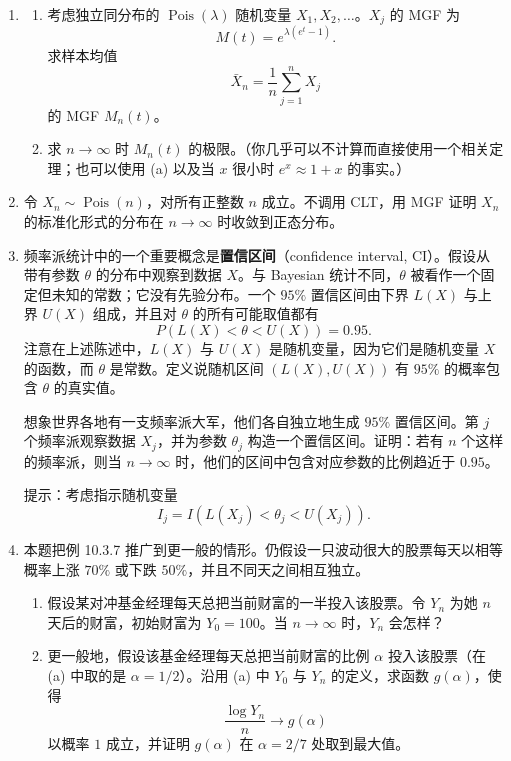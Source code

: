 \documentclass[UTF8, 12pt, fontset=fandol, oneside]{ctexart}
\begin{document}
\begin{enumerate}
  \item
  \begin{enumerate}
    \item 考虑独立同分布的 $\operatorname{Pois}(\lambda)$ 随机变量 $X_1,X_2,\ldots$。$X_j$ 的 MGF 为
    \[
      M(t)=e^{\lambda(e^t-1)}.
    \]
    求样本均值
    \[
      \bar X_n=\frac1n\sum_{j=1}^n X_j
    \]
    的 MGF $M_n(t)$。
    \item 求 $n\to\infty$ 时 $M_n(t)$ 的极限。（你几乎可以不计算而直接使用一个相关定理；也可以使用 (a) 以及当 $x$ 很小时 $e^x\approx 1+x$ 的事实。）
  \end{enumerate}

  \item 令 $X_n\sim\operatorname{Pois}(n)$，对所有正整数 $n$ 成立。不调用 CLT，用 MGF 证明 $X_n$ 的标准化形式的分布在 $n\to\infty$ 时收敛到正态分布。

  \item 频率派统计中的一个重要概念是\textbf{置信区间}（confidence interval, CI）。假设从带有参数 $\theta$ 的分布中观察到数据 $X$。与 Bayesian 统计不同，$\theta$ 被看作一个固定但未知的常数；它没有先验分布。一个 $95\%$ 置信区间由下界 $L(X)$ 与上界 $U(X)$ 组成，并且对 $\theta$ 的所有可能取值都有
  \[
    P(L(X)<\theta<U(X))=0.95.
  \]
  注意在上述陈述中，$L(X)$ 与 $U(X)$ 是随机变量，因为它们是随机变量 $X$ 的函数，而 $\theta$ 是常数。定义说随机区间 $(L(X),U(X))$ 有 $95\%$ 的概率包含 $\theta$ 的真实值。

  想象世界各地有一支频率派大军，他们各自独立地生成 $95\%$ 置信区间。第 $j$ 个频率派观察数据 $X_j$，并为参数 $\theta_j$ 构造一个置信区间。证明：若有 $n$ 个这样的频率派，则当 $n\to\infty$ 时，他们的区间中包含对应参数的比例趋近于 $0.95$。

  提示：考虑指示随机变量
  \[
    I_j=I(L(X_j)<\theta_j<U(X_j)).
  \]

  \item 本题把例 10.3.7 推广到更一般的情形。仍假设一只波动很大的股票每天以相等概率上涨 $70\%$ 或下跌 $50\%$，并且不同天之间相互独立。
  \begin{enumerate}
    \item 假设某对冲基金经理每天总把当前财富的一半投入该股票。令 $Y_n$ 为她 $n$ 天后的财富，初始财富为 $Y_0=100$。当 $n\to\infty$ 时，$Y_n$ 会怎样？
    \item 更一般地，假设该基金经理每天总把当前财富的比例 $\alpha$ 投入该股票（在 (a) 中取的是 $\alpha=1/2$）。沿用 (a) 中 $Y_0$ 与 $Y_n$ 的定义，求函数 $g(\alpha)$，使得
    \[
      \frac{\log Y_n}{n}\to g(\alpha)
    \]
    以概率 $1$ 成立，并证明 $g(\alpha)$ 在 $\alpha=2/7$ 处取到最大值。
  \end{enumerate}
\end{enumerate}
\end{document}
